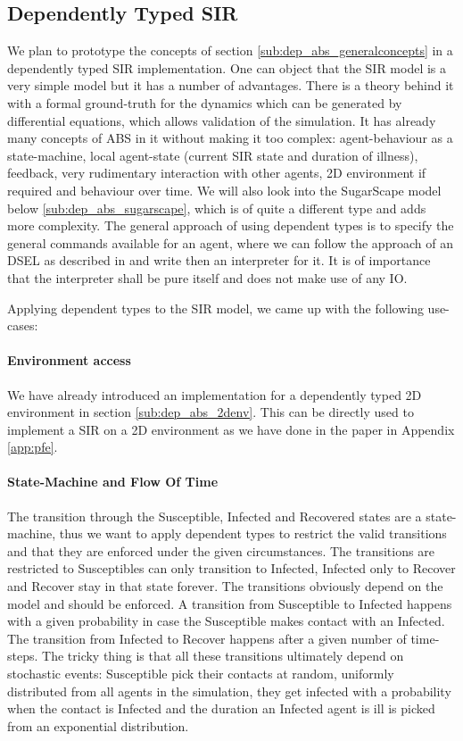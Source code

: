 \subsection{Dependently Typed SIR}
\label{sub:dep_abs_sir}
We plan to prototype the concepts of section \ref{sub:dep_abs_generalconcepts} in a dependently typed SIR implementation. One can object that the SIR model \cite{kermack_contribution_1927} is a very simple model but it has a number of advantages. There is a theory behind it with a formal ground-truth for the dynamics which can be generated by differential equations, which allows validation of the simulation. It has already many concepts of ABS in it without making it too complex: agent-behaviour as a state-machine, local agent-state (current SIR state and duration of illness), feedback, very rudimentary interaction with other agents, 2D environment if required and behaviour over time. We will also look into the SugarScape model below \ref{sub:dep_abs_sugarscape}, which is of quite a different type and adds more complexity.
The general approach of using dependent types is to specify the general commands available for an agent, where we can follow the approach of an DSEL as described in \cite{brady_correct-by-construction_2010} and write then an interpreter for it. It is of importance that the interpreter shall be pure itself and does not make use of any IO.

Applying dependent types to the SIR model, we came up with the following use-cases:

\paragraph{Environment access}
We have already introduced an implementation for a dependently typed 2D environment in section \ref{sub:dep_abs_2denv}. This can be directly used to implement a SIR on a 2D environment as we have done in the paper in Appendix \ref{app:pfe}.

\paragraph{State-Machine and Flow Of Time}
The transition through the Susceptible, Infected and Recovered states are a state-machine, thus we want to apply dependent types to restrict the valid transitions and that they are enforced under the given circumstances. The transitions are restricted to Susceptibles can only transition to Infected, Infected only to Recover and Recover stay in that state forever. The transitions obviously depend on the model and should be enforced. A transition from Susceptible to Infected happens with a given probability in case the Susceptible makes contact with an Infected. The transition from Infected to Recover happens after a given number of time-steps.
The tricky thing is that all these transitions ultimately depend on stochastic events: Susceptible pick their contacts at random, uniformly distributed from all agents in the simulation, they get infected with a probability when the contact is Infected and the duration an Infected agent is ill is picked from an exponential distribution.

